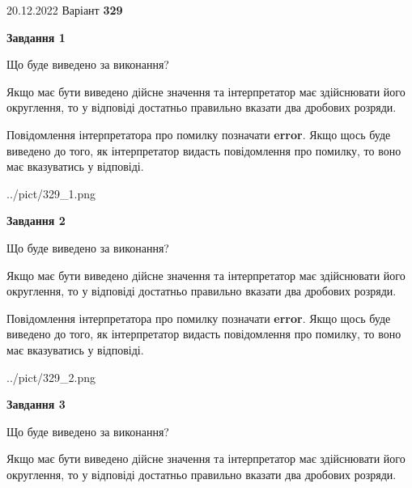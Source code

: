 \documentclass[12pt, ukrainian]{article}
\begin{document}
{20.12.2022 Варіант \No \textbf { 329 }\par}
{
\begin {Large}

{\begin {center}\textbf{Завдання 1}\end {center}}\par
Що буде виведено за виконання? \par

Якщо має бути виведено дійсне значення та інтерпретатор має здійснювати його округлення, 
то у відповіді достатньо правильно вказати два дробових розряди.

Повідомлення інтерпретатора про помилку позначати \textbf{error}.
Якщо щось буде виведено до того, як інтерпретатор видасть повідомлення про помилку, 
то воно має вказуватись у відповіді. \par

\begin{center}
	{../pict/329_1.png}
\end{center}
\newpage

{\begin {center}\textbf{Завдання 2}\end {center}}\par
Що буде виведено за виконання? \par

Якщо має бути виведено дійсне значення та інтерпретатор має здійснювати його округлення, 
то у відповіді достатньо правильно вказати два дробових розряди.

Повідомлення інтерпретатора про помилку позначати \textbf{error}.
Якщо щось буде виведено до того, як інтерпретатор видасть повідомлення про помилку, 
то воно має вказуватись у відповіді. \par

\begin{center}
	{../pict/329_2.png}
\end{center}
\newpage

{\begin {center}\textbf{Завдання 3}\end {center}}\par
Що буде виведено за виконання? \par

Якщо має бути виведено дійсне значення та інтерпретатор має здійснювати його округлення, 
то у відповіді достатньо правильно вказати два дробових розряди.


\end{Large}}
\end{document}
